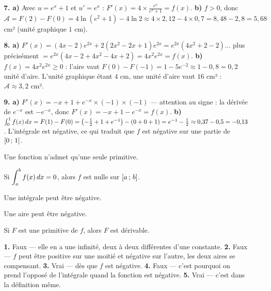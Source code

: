 \begin{corrige}[annales]
\textbf{7. a)} Avec $u = e^{x}+1$ et $u' = e^{x}$ :
$F'(x) = 4\times\frac{e^{x}}{e^{x}+1} = f(x)$.
\textbf{b)} $f>0$, donc $\mathcal A = F(2)-F(0)
= 4\ln\left(e^{2}+1\right)-4\ln2 \approx 4\times2{,}12-4\times0{,}7
= 8{,}48-2{,}8 = 5{,}68$ cm² (unité graphique $1$ cm).

\textbf{8. a)} $F'(x) = (4x-2)e^{2x}+2\left(2x^{2}-2x+1\right)e^{2x}
= e^{2x}\left(4x^{2}+2-2\right)\dots$ plus précisément
$= e^{2x}\left(4x-2+4x^{2}-4x+2\right) = 4x^{2}e^{2x} = f(x)$.
\textbf{b)} $f(x) = 4x^{2}e^{2x} \geq 0$ : l'aire vaut
$F(0)-F(-1) = 1-5e^{-2} \approx 1-0{,}8 = 0{,}2$ unité d'aire. L'unité
graphique étant $4$ cm, une unité d'aire vaut $16$ cm² :
$\mathcal A \approx 3{,}2$ cm².

\textbf{9. a)} $F'(x) = -x+1+e^{-x}\times(-1)\times(-1)$ — attention au
signe : la dérivée de $e^{-x}$ est $-e^{-x}$, donc
$F'(x) = -x+1-e^{-x} = f(x)$. \checkmark
\textbf{b)} $\int_{0}^{1} f(x)\,dx = F(1)-F(0)
= \left(-\frac12+1+e^{-1}\right)-\left(0+0+1\right) = e^{-1}-\frac12
\approx 0{,}37-0{,}5 = -0{,}13$. L'intégrale est négative, ce qui traduit
que $f$ est négative sur une partie de $\left[0\,;\,1\right]$.
\end{corrige}

\begin{vraifaux}
\exo Une fonction n'admet qu'une seule primitive.

\exo Si $\displaystyle\int_{a}^{b} f(x)\,dx = 0$, alors $f$ est nulle sur
$\left[a\,;\,b\right]$.

\exo Une intégrale peut être négative.

\exo Une aire peut être négative.

\exo Si $F$ est une primitive de $f$, alors $F$ est dérivable.
\end{vraifaux}

\begin{corrige}
\textbf{1.} Faux — elle en a une infinité, deux à deux différentes d'une
constante.
\textbf{2.} Faux — $f$ peut être positive sur une moitié et négative sur
l'autre, les deux aires se compensant.
\textbf{3.} Vrai — dès que $f$ est négative.
\textbf{4.} Faux — c'est pourquoi on prend l'opposé de l'intégrale quand la
fonction est négative.
\textbf{5.} Vrai — c'est dans la définition même.
\end{corrige}

